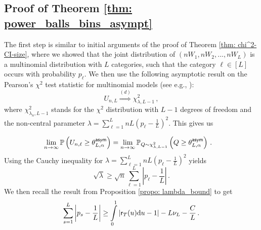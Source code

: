 \documentclass[11pt]{article}
\begin{document}
 


\subsection{Proof of Theorem \ref{thm: power_balls_bins_asympt}} \label{proof:thm: power_balls_bins_asympt} 
 The first step is similar to initial arguments of the proof of Theorem \ref{thm: chi^2-CI-size}, where we showed that the joint distribution of $(nW_1,nW_2,...,nW_{L})$ is a multinomial distribution with $L$ categories, such that the category $\ell\in [L]$ occurs with probability $p_\ell$. We then use the following asymptotic result on the Pearson's $\chi^2$ test statistic for multinomial models (see e.g., \cite[Theorem 14.3.1]{lehmann2006testing}):
	\begin{equation}\label{eq: asympt-power-multi-pearson}
	U_{n,L} \overset{(d)}{\Rightarrow} \chi^2_{\lambda,L-1}\,,
	\end{equation}   
where $\chi^2_{\lambda_n,L-1}$ stands for the $\chi^2$ distribution with $L-1$ degrees of freedom and the non-central parameter $\lambda=\sum\limits_{\ell=1}^{L}nL\left(p_\ell-\frac{1}{L}\right)^2$.  This gives us

\begin{align}\label{eq: tmp-power}
\lim\limits_{n\rightarrow \infty}^{} {\mathbb P}\left(U_{n,\ell}\geq \theta^{\mathsf{asym}}_{L,\alpha} \right)&= \lim\limits_{n\rightarrow \infty}^{} {\mathbb P}_{Q\sim  \chi^2_{\lambda,L-1}} \left(Q\geq \theta^{\mathsf{asym}}_{L,\alpha} \right)\,.
\end{align}
Using the Cauchy inequality for $\lambda=\sum\limits_{\ell=1}^{L}nL\left(p_\ell-\frac{1}{L}\right)^2$ yields
$$\sqrt{\lambda}\geq \sqrt{n}\sum\limits_{\ell=1}^{L}\left|p_\ell-\frac{1}{L}\right|\,. $$
We then recall the result from Proposition \ref{propo: lambda_bound} to get
\begin{align}\label{eq:dum1_5}
\sum\limits_{s=1}^{L} \left| p_s-\frac{1}{L}\right| \geq 
\int\limits_{0}^{1}|\mathsf{r}_T(u){\rm d} u-1|-L \nu_L-\frac{C}{L}\,.
\end{align}
\end{document}
